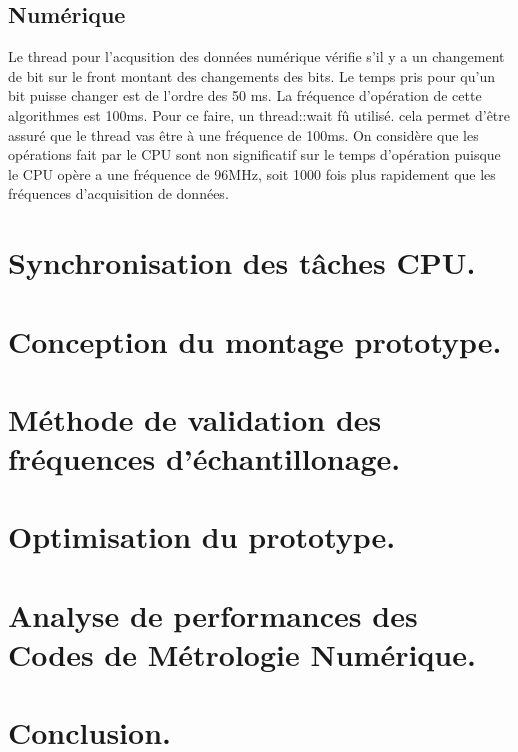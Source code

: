 \documentclass[12pt]{article}
\begin{document}
\subsection{Numérique}
\noindent
Le thread pour l'acqusition des données numérique vérifie s'il y a un changement de bit sur le front montant des changements des bits. Le temps pris pour qu'un bit puisse changer est de l'ordre des 50 ms. La fréquence d'opération de cette algorithmes est 100ms. Pour ce faire, un thread::wait fû utilisé. cela permet d'être assuré que le thread vas être à une fréquence de 100ms. On considère que les opérations fait par le CPU sont non significatif sur le temps d'opération puisque le CPU opère a une fréquence de 96MHz, soit 1000 fois plus rapidement que les fréquences d'acquisition de données.
\section{Synchronisation des tâches CPU.}
\section{Conception du montage prototype.}
\section{Méthode de validation des fréquences d'échantillonage.}
\section{Optimisation du prototype.}
\section{Analyse de performances des Codes de Métrologie Numérique.}
\section{Conclusion.}
\end{document}
